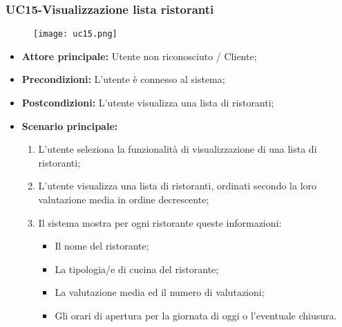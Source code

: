 \pagebreak
\subsubsection{UC15-Visualizzazione lista ristoranti}
\begin{figure}[h] \texttt{[image: uc15.png]} \end{figure}
\begin{itemize}
\item \textbf{Attore principale:} Utente non riconosciuto / Cliente;
\item \textbf{Precondizioni:} L'utente è connesso al sistema;
\item \textbf{Postcondizioni:} L'utente visualizza una lista di ristoranti;
\item \textbf{Scenario principale:}
\begin{enumerate}
    \item L'utente seleziona la funzionalità di visualizzazione di una lista di ristoranti;
    \item L'utente visualizza una lista di ristoranti, ordinati secondo la loro valutazione media in ordine decrescente;
    \item Il sistema mostra per ogni ristorante queste informazioni:
       \begin{itemize}
           \item Il nome del ristorante;
           \item La tipologia/e di cucina del ristorante;
           \item La valutazione media ed il numero di valutazioni;
           \item Gli orari di apertura per la giornata di oggi o l'eventuale chiusura.
       \end{itemize}
\end{enumerate}
\end{itemize}

\pagebreak

